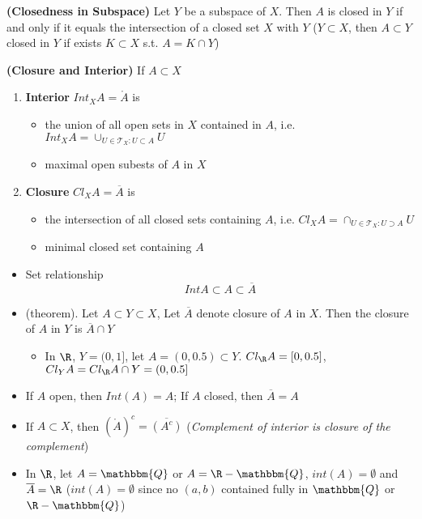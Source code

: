 \documentclass[10.5pt]{article}
\newcommand{\calT}{\mathcal{T}}
\newcommand{\Q}{\mathbbm{Q}}
\begin{document}
\begin{theorem*}
    \textbf{(Closedness in Subspace)} Let $Y$ be a subspace of $X$. Then $A$ is closed in $Y$ if and only if it equals the intersection of a closed set $X$ with $Y$ ($Y\subset X$, then $A\subset Y$ closed in $Y$ if exists $K\subset X$ s.t. $A=K\cap Y$)
\end{theorem*}


\begin{defn*}
    \textbf{(Closure and Interior)} If $A\subset X$
    \begin{enumerate}
        \item \textbf{Interior} $Int_X A = \mathring{A}$ is
        \begin{itemize}
            \item the union of all open sets in $X$ contained in $A$, i.e. $Int_X A = \cup_{U\in \calT_X : U\subset A} U$
            \item maximal open subests of $A$ in $X$
        \end{itemize}
        \item \textbf{Closure} $Cl_X A = \overline{A}$ is
        \begin{itemize}
            \item the intersection of all closed sets containing $A$, i.e. $Cl_X A = \cap_{U\in \calT_X : U\supset A} U$
            \item minimal closed set containing $A$
        \end{itemize}
    \end{enumerate}
    \begin{itemize}
        \item Set relationship
        \[
            Int A \subset A \subset \overline{A}    
        \]
        \item (theorem). Let $A\subset Y\subset X$, Let $\overline{A}$ denote closure of $A$ in $X$. Then the closure of $A$ in $Y$ is $\overline{A}\cap Y$
        \begin{itemize}
            \item In $\R$, $Y=(0,1]$, let $A=(0,0.5) \subset Y$. $Cl_{\R} A = [0, 0.5]$, $Cl_{Y} A = Cl_{\R} A \cap Y = (0, 0.5]$
        \end{itemize}
        \item If $A$ open, then $Int(A) = A$; If $A$ closed, then $\overline{A} = A$
        \item If $A\subset X$, then $(\mathring{A})^c = \overline{(A^c)}$ (\textit{Complement of interior is closure of the complement})
        \item In $\R$, let $A = \Q$ or $A = \R - \Q$, $int(A) = \emptyset$ and $\overline{A} = \R$ ($int(A)=\emptyset$ since no $(a,b)$ contained fully in $\Q$ or $\R-\Q$)
    \end{itemize}
\end{defn*}
\end{document}
